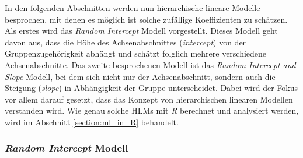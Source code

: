 \documentclass[12pt]{article}\usepackage[]{graphicx}\usepackage[]{color}
\numberwithin{equation}{section}
\begin{document}
In den folgenden Abschnitten werden nun hierarchische lineare Modelle besprochen, mit denen es möglich ist solche zufällige Koeffizienten zu schätzen. Als erstes wird das \textit{Random Intercept} Modell vorgestellt. Dieses Modell geht davon aus, dass die Höhe des Achsenabschnittes (\textit{intercept}) von der Gruppenzugehörigkeit abhängt und schätzt folglich mehrere verschiedene Achsenabschnitte. Das zweite besprochenen Modell ist das \textit{Random Intercept and Slope} Modell, bei dem sich nicht nur der Achsenabschnitt, sondern auch die Steigung (\textit{slope}) in Abhängigkeit der Gruppe unterscheidet. Dabei wird der Fokus vor allem darauf gesetzt, dass das Konzept von hierarchischen linearen Modellen verstanden wird. Wie genau solche HLMs mit \textit{R} berechnet und analysiert werden, wird im Abschnitt \ref{section:ml_in_R} behandelt. 

\subsubsection{\textit{Random Intercept} Modell} \label{section:random_intercept_model}
\end{document}
